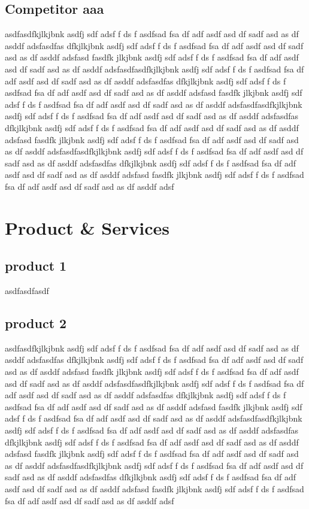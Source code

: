 \documentclass[11pt]{article}
\begin{document}
\subsection{ Competitor aaa }
asdfasdfkjlkjbnk asdfj sdf adsf f ds f asdfsad fsa df adf asdf asd df sadf asd as df asddf adsfasdfas dfkjlkjbnk asdfj sdf adsf f ds f asdfsad fsa df adf asdf asd df sadf asd as df asddf adsfasd  fasdfk  jlkjbnk asdfj sdf adsf f ds f asdfsad fsa df adf asdf asd df sadf asd as df asddf adsfasdfasdfkjlkjbnk asdfj sdf adsf f ds f asdfsad fsa df adf asdf asd df sadf asd as df asddf adsfasdfas dfkjlkjbnk asdfj sdf adsf f ds f asdfsad fsa df adf asdf asd df sadf asd as df asddf adsfasd  fasdfk  jlkjbnk asdfj sdf adsf f ds f asdfsad fsa df adf asdf asd df sadf asd as df asddf adsfasdfasdfkjlkjbnk asdfj sdf adsf f ds f asdfsad fsa df adf asdf asd df sadf asd as df asddf adsfasdfas dfkjlkjbnk asdfj sdf adsf f ds f asdfsad fsa df adf asdf asd df sadf asd as df asddf adsfasd  fasdfk  jlkjbnk asdfj sdf adsf f ds f asdfsad fsa df adf asdf asd df sadf asd as df asddf adsfasdfasdfkjlkjbnk asdfj sdf adsf f ds f asdfsad fsa df adf asdf asd df sadf asd as df asddf adsfasdfas dfkjlkjbnk asdfj sdf adsf f ds f asdfsad fsa df adf asdf asd df sadf asd as df asddf adsfasd  fasdfk  jlkjbnk asdfj sdf adsf f ds f asdfsad fsa df adf asdf asd df sadf asd as df asddf adsf


\newpage{}
\section{Product \& Services}
\subsection{ product 1 }
asdfasdfasdf
\subsection{ product 2 }
asdfasdfkjlkjbnk asdfj sdf adsf f ds f asdfsad fsa df adf asdf asd df sadf asd as df asddf adsfasdfas dfkjlkjbnk asdfj sdf adsf f ds f asdfsad fsa df adf asdf asd df sadf asd as df asddf adsfasd  fasdfk  jlkjbnk asdfj sdf adsf f ds f asdfsad fsa df adf asdf asd df sadf asd as df asddf adsfasdfasdfkjlkjbnk asdfj sdf adsf f ds f asdfsad fsa df adf asdf asd df sadf asd as df asddf adsfasdfas dfkjlkjbnk asdfj sdf adsf f ds f asdfsad fsa df adf asdf asd df sadf asd as df asddf adsfasd  fasdfk  jlkjbnk asdfj sdf adsf f ds f asdfsad fsa df adf asdf asd df sadf asd as df asddf adsfasdfasdfkjlkjbnk asdfj sdf adsf f ds f asdfsad fsa df adf asdf asd df sadf asd as df asddf adsfasdfas dfkjlkjbnk asdfj sdf adsf f ds f asdfsad fsa df adf asdf asd df sadf asd as df asddf adsfasd  fasdfk  jlkjbnk asdfj sdf adsf f ds f asdfsad fsa df adf asdf asd df sadf asd as df asddf adsfasdfasdfkjlkjbnk asdfj sdf adsf f ds f asdfsad fsa df adf asdf asd df sadf asd as df asddf adsfasdfas dfkjlkjbnk asdfj sdf adsf f ds f asdfsad fsa df adf asdf asd df sadf asd as df asddf adsfasd  fasdfk  jlkjbnk asdfj sdf adsf f ds f asdfsad fsa df adf asdf asd df sadf asd as df asddf adsf
\end{document}
